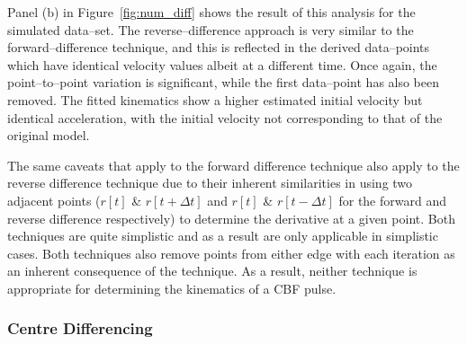 Panel (b) in Figure~\ref{fig:num_diff} shows the result of this analysis for the simulated data--set. The reverse--difference approach is very similar to the forward--difference technique, and this is reflected in the derived data--points which have identical velocity values albeit at a different time. Once again, the point--to--point variation is significant, while the first data--point has also been removed. The fitted kinematics show a higher estimated initial velocity but identical acceleration, with the initial velocity not corresponding to that of the original model.

The same caveats that apply to the forward difference technique also apply to the reverse difference technique due to their inherent similarities in using two adjacent points ($r[t]$ \& $r[t+\Delta t]$ and $r[t]$ \& $r[t-\Delta t]$ for the forward and reverse difference respectively) to determine the derivative at a given point. Both techniques are quite simplistic and as a result are only applicable in simplistic cases. Both techniques also remove points from either edge with each iteration as an inherent consequence of the technique. As a result, neither technique is appropriate for determining the kinematics of a CBF pulse.

\subsubsection{Centre Differencing}
\label{subsubsect:c_diff}

